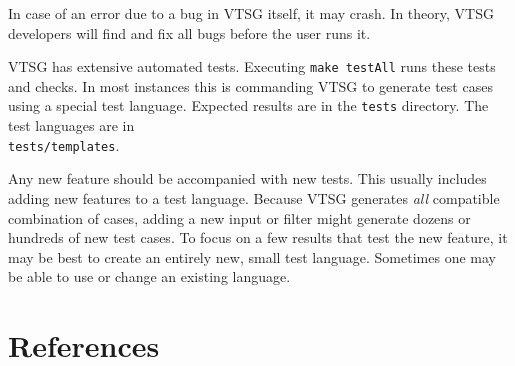 In case of an error due to a bug in VTSG itself, it may crash.  In theory, VTSG
developers will find and fix all bugs before the user runs it.

VTSG has extensive automated tests.  Executing \verb|make testAll| runs these tests
and checks.  In most instances this is commanding VTSG to generate test cases using a
special test language.  Expected results are in the \verb|tests| directory.  The
test languages are in \\ \verb|tests/templates|.

Any new feature should be accompanied with new tests.  This usually includes adding
new features to a test language.  Because VTSG generates \emph{all} compatible
combination of cases, adding a new input or filter might generate dozens or hundreds
of new test cases.  To focus on a few results that test the new feature, it may be
best to create an entirely new, small test language.  Sometimes one may be able to
use or change an existing language.


\section*{References}



%
%

